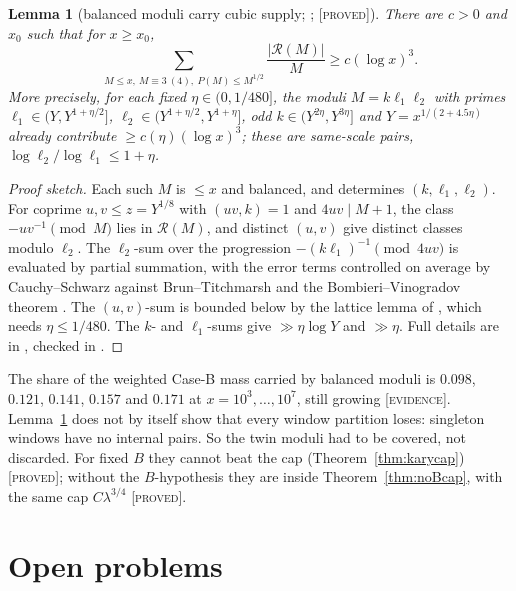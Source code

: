 \documentclass[10pt,reqno]{amsart}
\newtheorem{lemma}[theorem]{Lemma}
\theoremstyle{definition}
\theoremstyle{remark}
\newcommand{\cR}{\mathscr R}
\newcommand{\lab}[1]{\textup{[\textsc{#1}]}}
\begin{document}
\begin{lemma}[balanced moduli carry cubic supply; {\cite[Lemma~3.8]{ET}}; \lab{proved}]\label{lem:balancedsupply}
There are $c>0$ and $x_0$ such that for $x\geq x_0$,
\[
 \sum_{M\leq x,\ M\equiv3\ (4),\ P(M)\leq M^{1/2}}\frac{|\cR(M)|}M\geq c(\log x)^3.
\]
More precisely, for each fixed $\eta\in(0,1/480]$, the moduli $M=k\ell_1\ell_2$
with primes $\ell_1\in(Y,Y^{1+\eta/2}]$, $\ell_2\in(Y^{1+\eta/2},Y^{1+\eta}]$, odd
$k\in(Y^{2\eta},Y^{3\eta}]$ and $Y=x^{1/(2+4.5\eta)}$ already contribute
$\geq c(\eta)(\log x)^3$; these are same-scale pairs,
$\log\ell_2/\log\ell_1\leq1+\eta$.
\end{lemma}
\begin{proof}[Proof sketch]
Each such $M$ is $\leq x$ and balanced, and determines $(k,\ell_1,\ell_2)$.
For coprime $u,v\leq z=Y^{1/8}$ with $(uv,k)=1$ and $4uv\mid M+1$, the class
$-uv^{-1}\pmod M$ lies in $\cR(M)$, and distinct $(u,v)$ give distinct
classes modulo $\ell_2$.  The $\ell_2$-sum over the progression
$-(k\ell_1)^{-1}\pmod{4uv}$ is evaluated by partial summation, with the
error terms controlled on average by Cauchy--Schwarz against
Brun--Titchmarsh and the Bombieri--Vinogradov theorem
\cite[Ch.~28]{Davenport}.  The $(u,v)$-sum is bounded below by the
lattice lemma of \cite[Lemma~3.1]{LL}, which needs $\eta\leq1/480$.  The
$k$- and $\ell_1$-sums give $\gg\eta\log Y$ and $\gg\eta$.  Full details are
in \cite[\S3.8]{ET}, checked in \cite[item~4]{ETrev}.
\end{proof}
The share of the weighted Case-B mass carried by balanced moduli is
$0.098$, $0.121$, $0.141$, $0.157$ and $0.171$ at $x=10^3,\dots,10^7$,
still growing \lab{evidence}.  Lemma~\ref{lem:balancedsupply} does not by itself
show that every window partition loses: singleton windows have no
internal pairs.  So the twin moduli had to be covered, not discarded.
For fixed $B$ they cannot beat the cap (Theorem~\ref{thm:karycap})
\lab{proved}; without the $B$-hypothesis they are inside
Theorem~\ref{thm:noBcap}, with the same cap $C\lambda^{3/4}$ \lab{proved}.

\section{Open problems}\label{sec:open}
\end{document}
